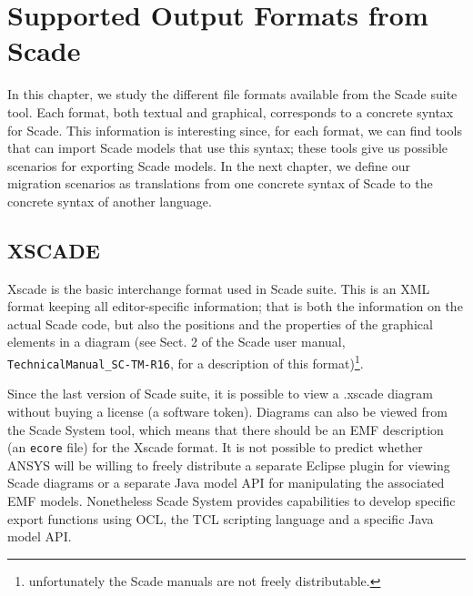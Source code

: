 \documentclass{template/openetcs_report}
\begin{document}
\chapter{Supported Output Formats from Scade}
\label{cha:supp-outp-form}

In this chapter, we study the different file formats available from
the Scade suite tool. Each format, both textual and graphical,
corresponds to a concrete syntax for Scade. This information is
interesting since, for each format, we can find tools that can import
Scade models that use this syntax; these tools give us possible
scenarios for exporting Scade models.  In the next chapter, we define
our migration scenarios as translations from one concrete syntax of
Scade to the concrete syntax of another language.


\section{XSCADE}
\label{sec:xscade}

Xscade is the basic interchange format used in Scade suite. This is an
XML format keeping all editor-specific information; that is both the
information on the actual Scade code, but also the positions and the
properties of the graphical elements in a diagram (see Sect. 2 of the
Scade user manual, \verb+TechnicalManual_SC-TM-R16+, for a description
of this format)\footnote{unfortunately the Scade manuals are not
  freely distributable.}.

Since the last version of Scade suite, it is possible to view a
.xscade diagram without buying a license (a software token). Diagrams
can also be viewed from the Scade System tool, which means that there
should be an EMF description (an \verb+ecore+ file) for the Xscade
format. It is not possible to predict whether ANSYS will be willing to
freely distribute a separate Eclipse plugin for viewing Scade diagrams
or a separate Java model API for manipulating the associated EMF
models. Nonetheless Scade System provides capabilities to develop
specific export functions using OCL, the TCL scripting language and a
specific Java model API.
\end{document}
